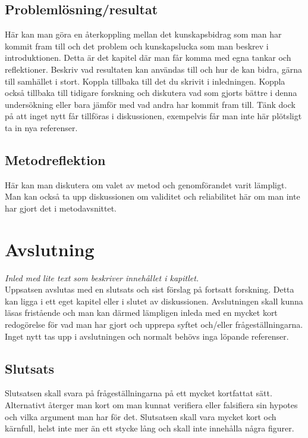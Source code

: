 \documentclass[a4paper,12pt]{article} %
\begin{document}
\subsection{Problemlösning/resultat}
Här kan man göra en återkoppling mellan det kunskapsbidrag som man har kommit fram till och det problem och kunskapslucka som man beskrev i introduktionen. Detta är det kapitel där man får komma med egna tankar och reflektioner. Beskriv vad resultaten kan användas till och hur de kan bidra, gärna till samhället i stort. Koppla tillbaka till det du skrivit i inledningen. Koppla också tillbaka till tidigare forskning och diskutera vad som gjorts bättre i denna undersökning eller bara jämför med vad andra har kommit fram till. Tänk dock på att inget nytt får tillföras i diskussionen, exempelvis får man inte här plötsligt ta in nya referenser.

\subsection{Metodreflektion}
Här kan man diskutera om valet av metod och genomförandet varit lämpligt. Man kan också ta upp diskussionen om validitet och reliabilitet här om man inte har gjort det i metodavsnittet. 

\newpage
		
\section{Avslutning}
\emph{Inled med lite text som beskriver innehållet i kapitlet.}\\
Uppsatsen avslutas med en slutsats och sist förslag på fortsatt forskning. Detta kan ligga i ett eget kapitel eller i slutet av diskussionen. Avslutningen skall kunna läsas fristående och man kan därmed lämpligen inleda med en mycket kort redogörelse för vad man har gjort och upprepa syftet och/eller frågeställningarna. Inget nytt tas upp i avslutningen och normalt behövs inga löpande referenser.

\subsection{Slutsats}
Slutsatsen skall svara på frågeställningarna på ett mycket kortfattat sätt. Alternativt återger man kort om man kunnat verifiera eller falsifiera sin hypotes och vilka argument man har för det. Slutsatsen skall vara mycket kort och kärnfull, helst inte mer än ett stycke lång och skall inte innehålla några figurer. 
\end{document}

